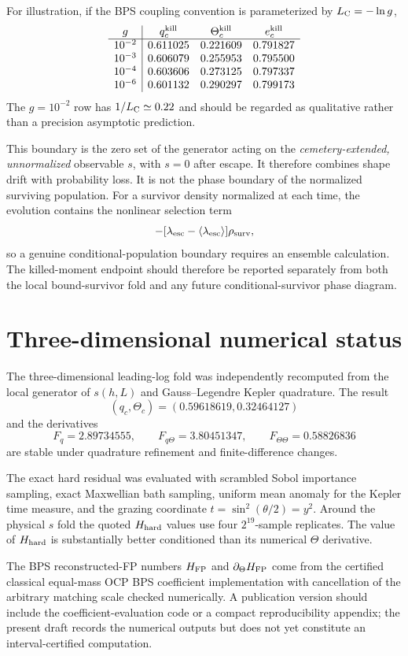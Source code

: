 \documentclass[11pt]{article}
\theoremstyle{remark}
\newcommand{\1}{\mathbf 1}
\begin{document}
For illustration, if the BPS coupling convention is parameterized by
$L_{\rm C}=-\ln g$,
\[
\begin{array}{c|ccc}
g&q_c^{\rm kill}&\Theta_c^{\rm kill}&e_c^{\rm kill}\\
\hline
10^{-2}&0.611025&0.221609&0.791827\\
10^{-3}&0.606079&0.255953&0.795500\\
10^{-4}&0.603606&0.273125&0.797337\\
10^{-6}&0.601132&0.290297&0.799173
\end{array}
\]
The $g=10^{-2}$ row has $1/L_{\rm C}\simeq0.22$ and should be regarded as
qualitative rather than a precision asymptotic prediction.

This boundary is the zero set of the generator acting on the
\emph{cemetery-extended, unnormalized} observable $s$, with $s=0$ after
escape.  It therefore combines shape drift with probability loss.  It is not
the phase boundary of the normalized surviving population.  For a survivor
density normalized at each time, the evolution contains the nonlinear
selection term
\[
-[\lambda_{\rm esc}-\langle\lambda_{\rm esc}\rangle]\rho_{\rm surv},
\]
so a genuine conditional-population boundary requires an ensemble
calculation.  The killed-moment endpoint should therefore be reported
separately from both the local bound-survivor fold and any future
conditional-survivor phase diagram.

\section{Three-dimensional numerical status}

The three-dimensional leading-log fold was independently recomputed from the
local generator of $s(h,L)$ and Gauss--Legendre Kepler quadrature.  The result
\[
(q_c,\Theta_c)=(0.59618619,0.32464127)
\]
and the derivatives
\[
F_q=2.89734555,\qquad
F_{q\Theta}=3.80451347,\qquad
F_{\Theta\Theta}=0.58826836
\]
are stable under quadrature refinement and finite-difference changes.

The exact hard residual was evaluated with scrambled Sobol importance
sampling, exact Maxwellian bath sampling, uniform mean anomaly for the Kepler
time measure, and the grazing coordinate
$t=\sin^2(\theta/2)=y^2$.  Around the physical $s$ fold the quoted
$H_{\rm hard}$ values use four $2^{19}$-sample replicates.  The value of
$H_{\rm hard}$ is substantially better conditioned than its numerical
$\Theta$ derivative.

The BPS reconstructed-FP numbers $H_{\rm FP}$ and
$\partial_\Theta H_{\rm FP}$ come from the certified classical equal-mass OCP
BPS coefficient implementation with cancellation of the arbitrary matching
scale checked numerically.  A publication version should include the
coefficient-evaluation code or a compact reproducibility appendix; the
present draft records the numerical outputs but does not yet constitute an
interval-certified computation.
\end{document}
